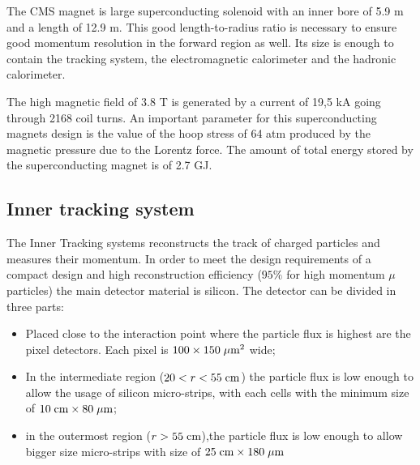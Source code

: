 The CMS magnet is large superconducting solenoid with an inner bore of 5.9 m and a length of 12.9 m.  This good length-to-radius ratio is necessary to ensure good momentum resolution in the forward region as well. Its size is enough to contain the tracking system, the electromagnetic calorimeter and the hadronic calorimeter. 

The high magnetic field of $3.8$ T is generated by a current of 19,5 kA going through 2168 coil turns. An important parameter for this superconducting magnets design is the value of the hoop stress of 64 atm produced by the magnetic pressure due to the Lorentz force. The amount of total energy stored by the superconducting magnet is of 2.7 GJ.

		

\clearpage

\subsection{Inner tracking system}

The Inner Tracking systems reconstructs the track of charged particles and measures their momentum. In order to meet the design requirements of a compact design and high reconstruction efficiency ($95\%$ for high momentum $\mu$ particles) the main detector material is silicon.
The detector can be divided in three parts:
\begin{itemize}
	\item Placed close to the interaction point where the particle flux is highest are the pixel detectors. Each pixel is $100\times150\;\mu\text{m}^{2}$ wide;
	\item In the intermediate region ($20 < r < 55\;\text{cm}$) the particle flux is low enough to allow the usage of silicon micro-strips, with each cells with the minimum size of $10\;\text{cm} \times 80\;\mu\text{m}$;
	\item in the outermost region ($r > 55\;\text{cm}$),the particle flux is low enough to allow bigger size micro-strips with size of $25\;\text{cm} \times 180 \;\mu\text{m}$ 
\end{itemize}

